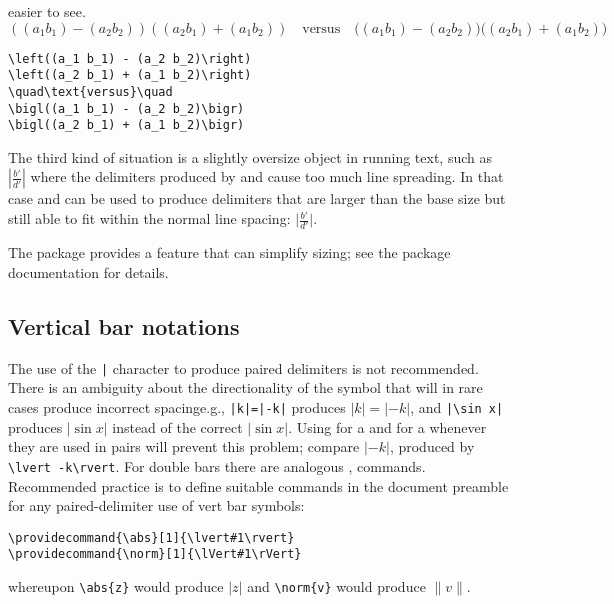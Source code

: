 easier to see.
\begin{equation*}
\left((a_1 b_1) - (a_2 b_2)\right)
\left((a_2 b_1) + (a_1 b_2)\right)
\quad\text{versus}\quad
\bigl((a_1 b_1) - (a_2 b_2)\bigr)
\bigl((a_2 b_1) + (a_1 b_2)\bigr)
\end{equation*}
\begin{verbatim}
\left((a_1 b_1) - (a_2 b_2)\right)
\left((a_2 b_1) + (a_1 b_2)\right)
\quad\text{versus}\quad
\bigl((a_1 b_1) - (a_2 b_2)\bigr)
\bigl((a_2 b_1) + (a_1 b_2)\bigr)
\end{verbatim}
The third kind of situation is a slightly oversize object in running
text, such as $\left\lvert\frac{b'}{d'}\right\rvert$ where the
delimiters produced by  and  cause too much line
spreading. In that case  and  can be used to produce
delimiters that are larger than the base size but still able to
fit within the normal line spacing:
$\bigl\lvert\frac{b'}{d'}\bigr\rvert$.

The  package provides a feature 
that can simplify sizing; see the package documentation for details.

\subsection{Vertical bar notations}\label{verts}

The use of the \verb'|' character to produce paired delimiters is not
recommended. There is an ambiguity about the directionality of the
symbol that will in rare cases produce incorrect spacing\mdash e.g.,
\verb'|k|=|-k|' produces $|k|=|-k|$, and \verb'|\sin x|' produces $|\sin x|$
instead of the correct $\lvert\sin x\rvert$. Using  for a  and  for a  whenever they are
used in pairs will prevent this problem; compare $\lvert -k\rvert$,
produced by \verb'\lvert -k\rvert'. For double bars there are analogous
,  commands. Recommended practice is to define
suitable commands in the document preamble for any paired-delimiter use
of vert bar symbols:
\begin{verbatim}
\providecommand{\abs}[1]{\lvert#1\rvert}
\providecommand{\norm}[1]{\lVert#1\rVert}
\end{verbatim}
whereupon \verb|\abs{z}| would produce $\lvert z\rvert$ and
\verb|\norm{v}| would produce $\lVert v\rVert$.



